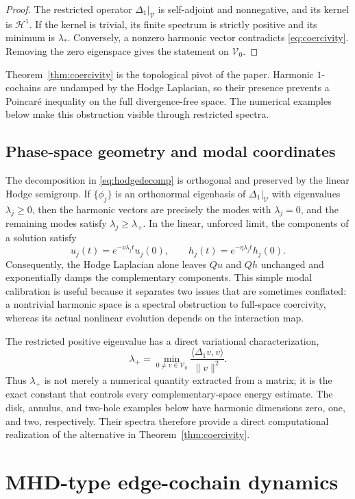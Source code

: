 \documentclass[11pt]{article}
\theoremstyle{remark}
\begin{document}
\begin{proof}
The restricted operator $\Delta_1|_{\mathcal V}$ is self-adjoint and nonnegative, and its kernel is $\mathcal H^1$. If the kernel is trivial, its finite spectrum is strictly positive and its minimum is $\lambda_*$. Conversely, a nonzero harmonic vector contradicts \eqref{eq:coercivity}. Removing the zero eigenspace gives the statement on $\mathcal V_0$.
\end{proof}

Theorem~\ref{thm:coercivity} is the topological pivot of the paper. Harmonic $1$-cochains are undamped by the Hodge Laplacian, so their presence prevents a Poincar\'e inequality on the full divergence-free space. The numerical examples below make this obstruction visible through restricted spectra.

\subsection{Phase-space geometry and modal coordinates}

The decomposition in \eqref{eq:hodgedecomp} is orthogonal and preserved by the linear Hodge semigroup. If $\{\phi_j\}$ is an orthonormal eigenbasis of $\Delta_1|_{\mathcal V}$ with eigenvalues $\lambda_j\geq0$, then the harmonic vectors are precisely the modes with $\lambda_j=0$, and the remaining modes satisfy $\lambda_j\geq\lambda_+$. In the linear, unforced limit, the components of a solution satisfy
\[
u_j(t)=e^{-\nu\lambda_jt}u_j(0),
\qquad
h_j(t)=e^{-\eta\lambda_jt}h_j(0).
\]
Consequently, the Hodge Laplacian alone leaves $Qu$ and $Qh$ unchanged and exponentially damps the complementary components. This simple modal calibration is useful because it separates two issues that are sometimes conflated: a nontrivial harmonic space is a spectral obstruction to full-space coercivity, whereas its actual nonlinear evolution depends on the interaction map.

The restricted positive eigenvalue has a direct variational characterization,
\[
\lambda_+=\min_{0\neq v\in\mathcal V_0}
\frac{\langle\Delta_1v,v\rangle}{\|v\|^2}.
\]
Thus $\lambda_+$ is not merely a numerical quantity extracted from a matrix; it is the exact constant that controls every complementary-space energy estimate. The disk, annulus, and two-hole examples below have harmonic dimensions zero, one, and two, respectively. Their spectra therefore provide a direct computational realization of the alternative in Theorem~\ref{thm:coercivity}.

\section{MHD-type edge-cochain dynamics}
\end{document}
